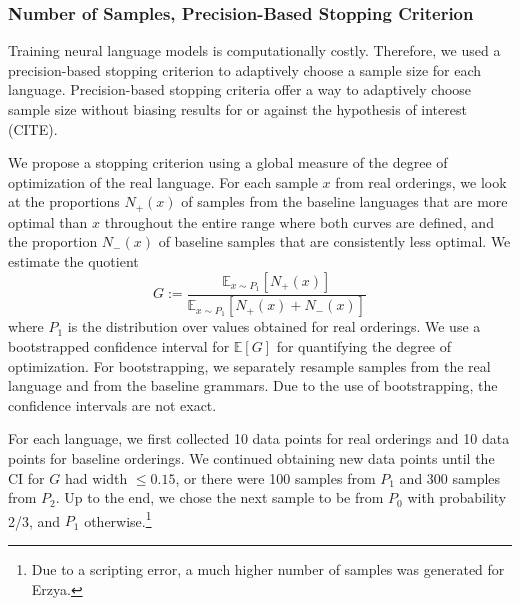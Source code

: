 \documentclass[11pt,letterpaper]{article}
\newcommand{\E}[0]{\mathbb{E}}
\begin{document}
\subsubsection{Number of Samples, Precision-Based Stopping Criterion}\label{ref:stopping-criterion}
Training neural language models is computationally costly.
Therefore, we used a precision-based stopping criterion to adaptively choose a sample size for each language.
Precision-based stopping criteria offer a way to adaptively choose sample size without biasing results for or against the hypothesis of interest (CITE).

We propose a stopping criterion using a global measure of the degree of optimization of the real language.
For each sample $x$ from real orderings, we look at the proportions $N_+(x)$ of samples from the baseline languages that are more optimal than $x$ throughout the entire range where both curves are defined, and the proportion $N_-(x)$ of baseline samples that are consistently less optimal.
We estimate the quotient
\begin{equation}\label{eq:g}
	G :=	\frac{\E_{x \sim P_1}[N_+(x)]}{\E_{x \sim P_1}[N_+(x) + N_-(x)]}
\end{equation}
where $P_1$ is the distribution over values obtained for real orderings.
We use a bootstrapped confidence interval for $\E[G]$ for quantifying the degree of optimization.
For bootstrapping, we separately resample samples from the real language and from the baseline grammars.
Due to the use of bootstrapping, the confidence intervals are not exact.



For each language, we first collected 10 data points for real orderings and 10 data points for baseline orderings.
We continued obtaining new data points until the CI for $G$ had width $\leq 0.15$, or there were 100 samples from $P_1$ and 300 samples from $P_2$.
Up to the end, we chose the next sample to be from $P_0$ with probability 2/3, and $P_1$ otherwise.\footnote{Due to a scripting error, a much higher number of samples was generated for Erzya.}
\end{document}

